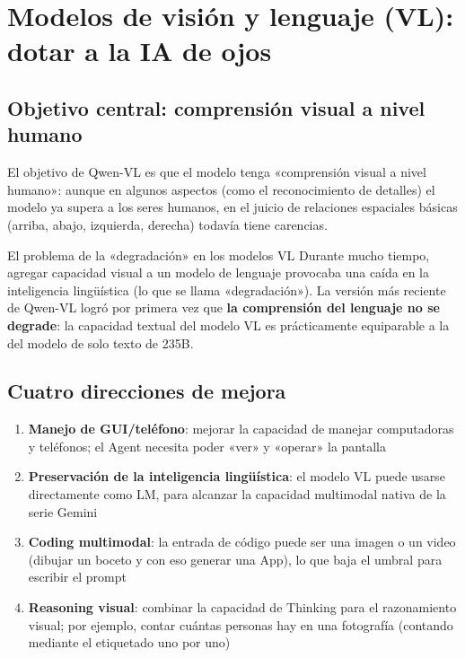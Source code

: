 \section{Modelos de visión y lenguaje (VL): dotar a la IA de ojos}

\subsection{Objetivo central: comprensión visual a nivel humano}

El objetivo de Qwen-VL es que el modelo tenga «comprensión visual a nivel humano»: aunque en algunos aspectos (como el reconocimiento de detalles) el modelo ya supera a los seres humanos, en el juicio de relaciones espaciales básicas (arriba, abajo, izquierda, derecha) todavía tiene carencias.

\begin{warningbox}{El problema de la «degradación» en los modelos VL}
Durante mucho tiempo, agregar capacidad visual a un modelo de lenguaje provocaba una caída en la inteligencia lingüística (lo que se llama «degradación»). La versión más reciente de Qwen-VL logró por primera vez que \textbf{la comprensión del lenguaje no se degrade}: la capacidad textual del modelo VL es prácticamente equiparable a la del modelo de solo texto de 235B.
\end{warningbox}

\subsection{Cuatro direcciones de mejora}

\begin{enumerate}
    \item \textbf{Manejo de GUI/teléfono}: mejorar la capacidad de manejar computadoras y teléfonos; el Agent necesita poder «ver» y «operar» la pantalla
    \item \textbf{Preservación de la inteligencia lingüística}: el modelo VL puede usarse directamente como LM, para alcanzar la capacidad multimodal nativa de la serie Gemini
    \item \textbf{Coding multimodal}: la entrada de código puede ser una imagen o un video (dibujar un boceto y con eso generar una App), lo que baja el umbral para escribir el prompt
    \item \textbf{Reasoning visual}: combinar la capacidad de Thinking para el razonamiento visual; por ejemplo, contar cuántas personas hay en una fotografía (contando mediante el etiquetado uno por uno)
\end{enumerate}

